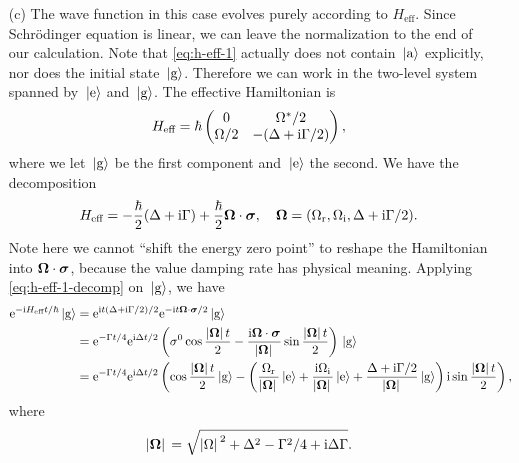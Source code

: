 \documentclass[hyperref, a4paper]{article}
\newcommand*{\ii}{\mathrm{i}}
\newcommand*{\ee}{\mathrm{e}}
\begin{document}
\begin{itemize}
\begin{algorithm*}[H]
  \end{algorithm*}
\item[(c)] The wave function in this case evolves purely according to $H_\text{eff}$. Since Schrödinger equation
is linear, we can leave the normalization to the end of our calculation. Note that \eqref{eq:h-eff-1} actually
does not contain $\ket*{\text{a}}$ explicitly, nor does the initial state $\ket*{\text{g}}$. Therefore we can 
work in the two-level system spanned by $\ket*{\text{e}}$ and $\ket*{\text{g}}$. The effective Hamiltonian is 
\begin{equation}
    H_\text{eff} = \hbar \pmqty{0 & \Omega^* / 2 \\ \Omega / 2 & - (\Delta + \ii \Gamma / 2)},
\end{equation}
where we let $\ket*{\text{g}}$ be the first component and $\ket*{\text{e}}$ the second. We have the decomposition 
\begin{equation}
    H_\text{eff} = - \frac{\hbar}{2} (\Delta + \ii \Gamma) + \frac{\hbar}{2} \vb*{\Omega} \cdot \vb*{\sigma}, \quad 
    \vb*{\Omega} = (\Omega_\text{r}, \Omega_\text{i}, \Delta + \ii \Gamma / 2).
    \label{eq:h-eff-1-decomp}
\end{equation}
Note here we cannot ``shift the energy zero point'' to reshape the Hamiltonian into $\vb*{\Omega} \cdot \vb*{\sigma}$, because 
the value damping rate has physical meaning. Applying \eqref{eq:h-eff-1-decomp} on $\ket*{\text{g}}$, we have 
\[
    \begin{aligned}
        \ee^{- \ii H_\text{eff} t / \hbar} \ket*{\text{g}} &= 
        \ee^{\ii t (\Delta + \ii \Gamma / 2) / 2} \ee^{- \ii t \vb*{\Omega} \cdot \vb*{\sigma} / 2} \ket*{\text{g}} \\
        &= \ee^{- \Gamma t / 4} \ee^{\ii \Delta t / 2} \left( \sigma^0 \cos \frac{\abs*{\vb*{\Omega}} t}{2}  
        - \frac{\ii \vb*{\Omega} \cdot \vb*{\sigma}}{\abs*{\vb*{\Omega}}} \sin \frac{\abs*{\vb*{\Omega}} t}{2} \right) \ket*{\text{g}} \\
        &= \ee^{- \Gamma t / 4} \ee^{\ii \Delta t / 2} \left(\cos \frac{\abs*{\vb*{\Omega}} t}{2} \ket*{\text{g}} - \left( \frac{\Omega_\text{r}}{\abs*{\vb*{\Omega}}} \ket*{\text{e}} + \frac{\ii \Omega_\text{i}}{\abs*{\vb*{\Omega}}} \ket*{\text{e}} + \frac{\Delta + \ii \Gamma / 2}{\abs*{\vb*{\Omega}}} \ket*{\text{g}} \right) \ii \sin \frac{\abs*{\vb*{\Omega}} t}{2} \right)  ,
    \end{aligned}
\] 
where 
\begin{equation}
    \abs*{\vb*{\Omega}} = \sqrt{\abs*{\Omega}^2 + \Delta^2 - \Gamma^2 / 4 + \ii \Delta \Gamma}.

\end{equation}
\end{itemize}
\end{document}
